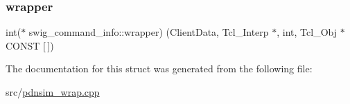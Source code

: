 \mbox{\label{structswig__command__info_acd779e4b3dc31b81f4e40b6f06128bea}} 
\subsubsection{\texorpdfstring{wrapper}{wrapper}}
{\footnotesize\ttfamily int($\ast$ swig\+\_\+command\+\_\+info\+::wrapper) (Client\+Data, Tcl\+\_\+\+Interp $\ast$, int, Tcl\+\_\+\+Obj $\ast$C\+O\+N\+ST \mbox{[}$\,$\mbox{]})}



The documentation for this struct was generated from the following file\+:\begin{DoxyCompactItemize}
\item 
src/\hyperlink{pdnsim__wrap_8cpp}{pdnsim\+\_\+wrap.\+cpp}\end{DoxyCompactItemize}
